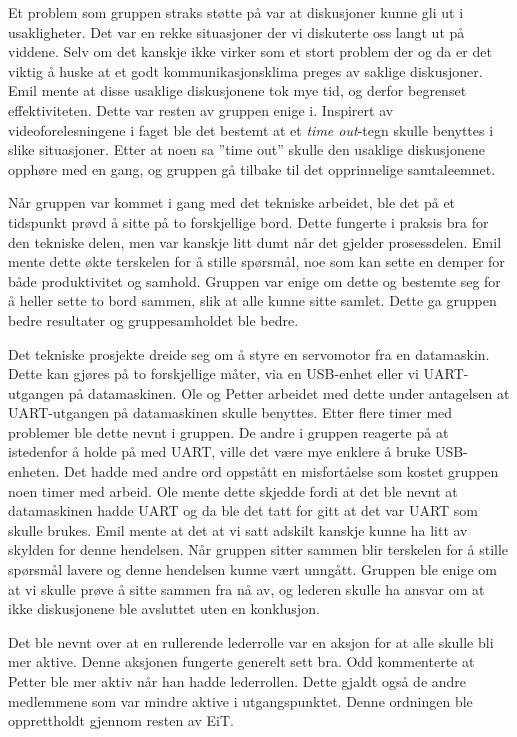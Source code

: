 Et problem som gruppen straks støtte på var at diskusjoner kunne gli ut i usakligheter. 
Det var en rekke situasjoner der vi diskuterte oss langt ut på viddene. 
Selv om det kanskje ikke virker som et stort problem der og da er det viktig å huske at et godt kommunikasjonsklima preges av saklige diskusjoner\citep{levin}. 
Emil mente at disse usaklige diskusjonene tok mye tid, og derfor begrenset effektiviteten. 
Dette var resten av gruppen enige i. 
Inspirert av videoforelesningene i faget\citep{video} ble det bestemt at et \textit{time out}-tegn skulle benyttes i slike situasjoner. 
Etter at noen sa ''time out'' skulle den usaklige diskusjonene opphøre med en gang, og gruppen gå tilbake til det opprinnelige samtaleemnet. 
\vspace{\secspace}

Når gruppen var kommet i gang med det tekniske arbeidet, ble det på et tidspunkt prøvd å sitte på to forskjellige bord. 
Dette fungerte i praksis bra for den tekniske delen, men var kanskje litt dumt når det gjelder prosessdelen. 
Emil mente dette økte terskelen for å stille spørsmål, noe som kan sette en demper for både produktivitet og samhold. 
Gruppen var enige om dette og bestemte seg for å heller sette to bord sammen, slik at alle kunne sitte samlet. 
Dette ga gruppen bedre resultater og gruppesamholdet ble bedre.
\vspace{\secspace}

Det tekniske prosjekte dreide seg om å styre en servomotor fra en datamaskin. 
Dette kan gjøres på to forskjellige måter, via en USB-enhet eller vi UART-utgangen på datamaskinen. 
Ole og Petter arbeidet med dette under antagelsen at UART-utgangen på datamaskinen skulle benyttes. 
Etter flere timer med problemer ble dette nevnt i gruppen. 
De andre i gruppen reagerte på at istedenfor å holde på med UART, ville det være mye enklere å bruke USB-enheten. 
Det hadde med andre ord oppstått en misfortåelse som kostet gruppen noen timer med arbeid. 
Ole mente dette skjedde fordi at det ble nevnt at datamaskinen hadde UART og da ble det tatt for gitt at det var UART som skulle brukes. 
Emil mente at det at vi satt adskilt kanskje kunne ha litt av skylden for denne hendelsen. 
Når gruppen sitter sammen blir terskelen for å stille spørsmål lavere og denne hendelsen kunne vært unngått. 
Gruppen ble enige om at vi skulle prøve å sitte sammen fra nå av, og lederen skulle ha ansvar om at ikke diskusjonene ble avsluttet uten en konklusjon. 
\vspace{\secspace}

Det ble nevnt over at en rullerende lederrolle var en aksjon for at alle skulle bli mer aktive. 
Denne aksjonen fungerte generelt sett bra. 
Odd kommenterte at Petter ble mer aktiv når han hadde lederrollen. 
Dette gjaldt også de andre medlemmene som var mindre aktive i utgangspunktet. 
Denne ordningen ble opprettholdt gjennom resten av EiT. 
\vspace{\secspace}

